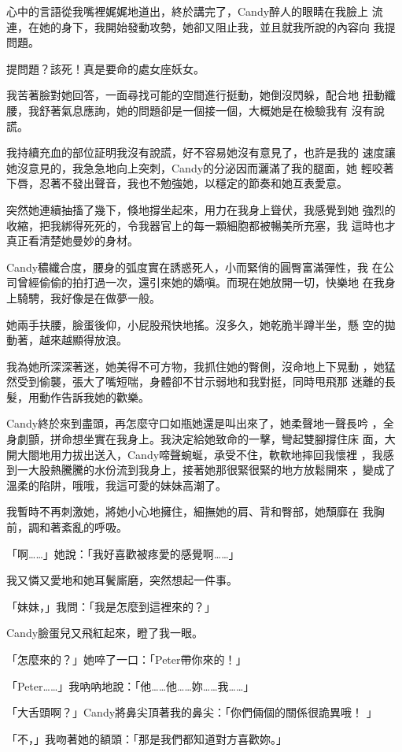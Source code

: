 心中的言語從我嘴裡娓娓地道出，終於講完了，Candy醉人的眼睛在我臉上
流連，在她的身下，我開始發動攻勢，她卻又阻止我，並且就我所說的內容向
我提問題。

提問題？該死！真是要命的處女座妖女。

我苦著臉對她回答，一面尋找可能的空間進行挺動，她倒沒閃躲，配合地
扭動纖腰，我舒著氣息應詢，她的問題卻是一個接一個，大概她是在檢驗我有
沒有說謊。

我持續充血的部位証明我沒有說謊，好不容易她沒有意見了，也許是我的
速度讓她沒意見的，我急急地向上突刺，Candy的分泌因而灑滿了我的腿面，她
輕咬著下唇，忍著不發出聲音，我也不勉強她，以穩定的節奏和她互表愛意。

突然她連續抽搐了幾下，倏地撐坐起來，用力在我身上聳伏，我感覺到她
強烈的收縮，把我綁得死死的，令我器官上的每一顆細胞都被暢美所充塞，我
這時也才真正看清楚她曼妙的身材。

Candy穠纖合度，腰身的弧度實在誘惑死人，小而緊俏的圓臀富滿彈性，我
在公司曾經偷偷的拍打過一次，還引來她的嬌嗔。而現在她放開一切，快樂地
在我身上騎騁，我好像是在做夢一般。

她兩手扶腰，臉蛋後仰，小屁股飛快地搖。沒多久，她乾脆半蹲半坐，懸
空的拋動著，越來越顯得放浪。

我為她所深深著迷，她美得不可方物，我抓住她的臀側，沒命地上下晃動
，她猛然受到偷襲，張大了嘴短喘，身體卻不甘示弱地和我對挺，同時甩飛那
迷離的長髮，用動作告訴我她的歡樂。

Candy終於來到盡頭，再怎麼守口如瓶她還是叫出來了，她柔聲地一聲長吟
，全身劇顫，拼命想坐實在我身上。我決定給她致命的一擊，彎起雙腳撐住床
面，大開大閤地用力拔出送入，Candy啼聲蜿蜒，承受不住，軟軟地摔回我懷裡
，我感到一大股熱騰騰的水份流到我身上，接著她那很緊很緊的地方放鬆開來
，變成了溫柔的陷阱，哦哦，我這可愛的妹妹高潮了。

我暫時不再刺激她，將她小心地擁住，細撫她的肩、背和臀部，她頹靡在
我胸前，調和著紊亂的呼吸。

「啊……」她說：「我好喜歡被疼愛的感覺啊……」

我又憐又愛地和她耳鬢廝磨，突然想起一件事。

「妹妹，」我問：「我是怎麼到這裡來的？」

Candy臉蛋兒又飛紅起來，瞪了我一眼。

「怎麼來的？」她啐了一口：「Peter帶你來的！」

「Peter……」我吶吶地說：「他……他……妳……我……」

「大舌頭啊？」Candy將鼻尖頂著我的鼻尖：「你們倆個的關係很詭異哦！
」

「不，」我吻著她的額頭：「那是我們都知道對方喜歡妳。」

